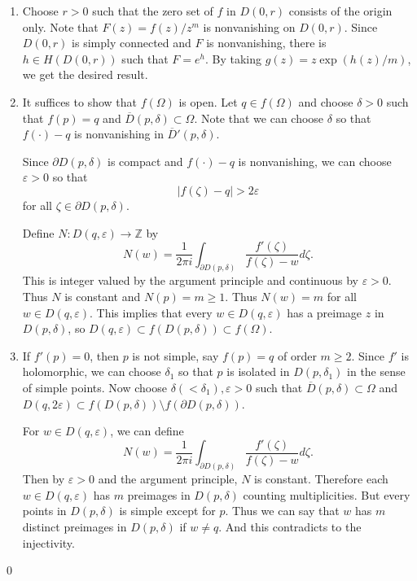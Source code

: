 \begin{problem}\hfill

	\begin{enumerate}[label = (\alph*)]
		\item Choose $r>0$ such that the zero set of $f$ in $D(0, r)$ consists of the origin only.
			Note that $F(z) = f(z) / z^m$ is nonvanishing on $D(0, r)$.
			Since $D(0, r)$ is simply connected and $F$ is nonvanishing, there is $h \in H(D(0,r))$ such that $F = e^h$.
			By taking $g(z) = z \exp(h(z)/m)$, we get the desired result.\\

		\item It suffices to show that $f(\Omega)$ is open.
			Let $q \in f(\Omega)$ and choose $\delta>0$ such that $f(p) = q$ and $\overline{D}(p, \delta) \subset \Omega$.
			Note that we can choose $\delta$ so that $f(\cdot) - q $ is nonvanishing in $\overline{D}'(p, \delta)$.

			Since $\partial D(p, \delta)$ is compact and $f(\cdot) -q$ is nonvanishing, we can choose $\varepsilon>0$ so that 
			\[
				\lvert f(\zeta) - q \lvert > 2\varepsilon
			\]
			for all $\zeta \in \partial D(p, \delta)$.

			Define $N: D(q, \varepsilon) \rightarrow \mathbb{Z}$ by
			\[
				N(w) = \frac{1}{2\pi i}\int_{\partial D(p, \delta)} \frac{f'(\zeta)}{f(\zeta) - w} d\zeta.
			\]
			This is integer valued by the argument principle and continuous by $\varepsilon>0$.
			Thus $N$ is constant and $N(p) = m \geq 1$. Thus $N(w) = m$ for all $w \in D(q, \varepsilon)$.
			This implies that every $w \in D(q, \varepsilon)$ has a preimage $z$ in $D(p, \delta)$,
			so $D(q, \varepsilon) \subset f(D(p, \delta)) \subset f(\Omega)$.\\

		\item If $f'(p) = 0$, then $p$ is not simple, say $f(p) = q$ of order $m \geq 2$.
			Since $f'$ is holomorphic, we can choose $\delta_1$ so that $p$ is isolated in $D(p, \delta_1)$ in the sense of simple points.
			Now choose $\delta( < \delta_1), \varepsilon>0$ such that $\overline{D}(p, \delta) \subset \Omega$ and $D(q, 2\varepsilon) \subset f(D(p, \delta)) \setminus f(\partial D(p, \delta))$.

			For $w \in D(q, \varepsilon)$, we can define
			\[
				N(w) = \frac{1}{2\pi i} \int_{\partial D(p, \delta)} \frac{f'(\zeta)}{f(\zeta) - w} d\zeta.
			\]
			Then by $\varepsilon>0$ and the argument principle, $N$ is constant.
			Therefore each $w \in D(q, \varepsilon)$ has $m$ preimages in $D(p, \delta)$ counting multiplicities.
			But every points in $D(p, \delta)$ is simple except for $p$.
			Thus we can say that $w$ has $m$ distinct preimages in $D(p, \delta)$ if $w \ne q$.
			And this contradicts to the injectivity.
	\end{enumerate}

	\qed
\end{problem}
